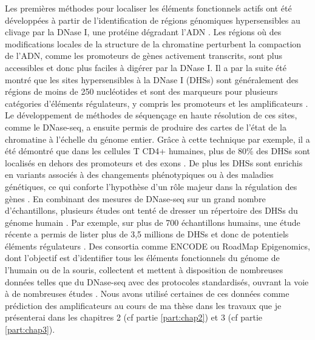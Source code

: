Les premières méthodes pour localiser les éléments fonctionnels actifs ont été développées à partir de l’identification de régions génomiques hypersensibles au clivage par la DNase I, une protéine dégradant l’ADN \citep{keene_dnase_1981, mcghee_200_1981}. Les régions où des modifications locales de la structure de la chromatine perturbent la compaction de l’ADN, comme les promoteurs de gènes activement transcrits, sont plus accessibles et donc plus faciles à digérer par la DNase I. Il a par la suite été montré que les sites hypersensibles à la DNase I (DHSs) sont généralement des régions de moins de 250 nucléotides et sont des marqueurs pour plusieurs catégories d'éléments régulateurs, y compris les promoteurs et les \glspl{amplificateur} \citep{felsenfeld_controlling_2003}. Le développement de méthodes de séquençage en haute résolution de ces sites, comme le DNase-seq, a ensuite permis de produire des cartes de l’état de la chromatine à l’échelle du génome entier. Grâce à cette technique par exemple, il a été démontré que dans les cellules T CD4+ humaines, plus de 80\% des DHSs sont localisés en dehors des promoteurs et des exons \citep{boyle_high-resolution_2008}. De plus les DHSs sont enrichis en variants associés à des changements phénotypiques ou à des maladies génétiques, ce qui conforte l’hypothèse d’un rôle majeur dans la régulation des gènes \citep{maurano_systematic_2012}. En combinant des mesures de DNase-seq sur un grand nombre d'échantillons, plusieurs études ont tenté de dresser un répertoire des DHSs du génome humain \citep{thurman_accessible_2012, meuleman_index_2020}. Par exemple, sur plus de 700 échantillons humains, une étude récente a permis de lister plus de 3,5 millions de DHSs et donc de potentiels éléments régulateurs \citep{meuleman_index_2020}. Des consortia comme ENCODE ou RoadMap Epigenomics, dont l’objectif est d’identifier tous les éléments fonctionnels du génome de l’humain ou de la souris, collectent et mettent à disposition de nombreuses données telles que du DNase-seq avec des protocoles standardisés, ouvrant la voie à de nombreuses études \citep{davis_encyclopedia_2018, roadmap_epigenomics_consortium_integrative_2015}. Nous avons utilisé certaines de ces données comme prédiction des \glspl{amplificateur} au cours de ma thèse dans les travaux que je présenterai dans les chapitres 2 (cf partie \ref{part:chap2}) et 3 (cf partie \ref{part:chap3}). \\

